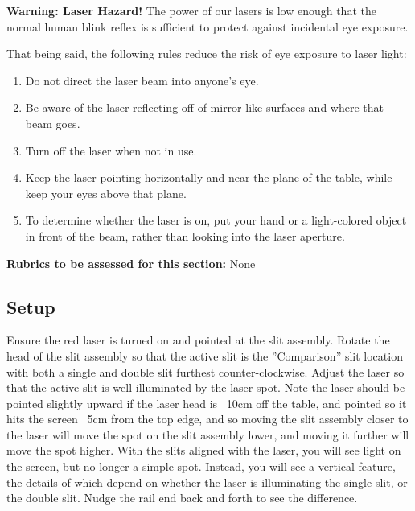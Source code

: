 \begin{framed}
	\textbf{Warning: Laser Hazard!} The power of our lasers is low enough that the normal human blink reflex is sufficient to protect against incidental eye exposure.
	
	That being said, the following rules reduce the risk of eye exposure to laser light:
	\begin{enumerate}
		\item Do not direct the laser beam into anyone's eye.
		\item Be aware of the laser reflecting off of mirror-like surfaces and where that beam goes.
		\item Turn off the laser when not in use.
		\item Keep the laser pointing horizontally and near the plane of the table, while keep your eyes above that plane.
		\item To determine whether the laser is on, put your hand or a light-colored object in front of the beam, rather than looking into the laser aperture.
	\end{enumerate}
\end{framed}

\textbf{Rubrics to be assessed for this section:} None%

\subsection{Setup}
Ensure the red laser is turned on and pointed at the slit assembly. Rotate the head of the slit assembly so that the active slit is the ''Comparison'' slit location with both a single
and double slit furthest counter-clockwise. Adjust the laser so that the active slit
is well illuminated by the laser spot. Note the laser should be pointed slightly upward if the laser head is ~10cm off the
table, and pointed so it hits the screen ~5cm from the top edge, and so moving the slit assembly closer to the laser will
move the spot on the slit assembly lower, and moving it further will move the spot higher. With the slits aligned with the
laser, you will see light on the screen, but no longer a simple spot. Instead, you will see a vertical feature, the details of
which depend on whether the laser is illuminating the single slit, or the double slit. Nudge the rail end back and forth to
see the difference.

